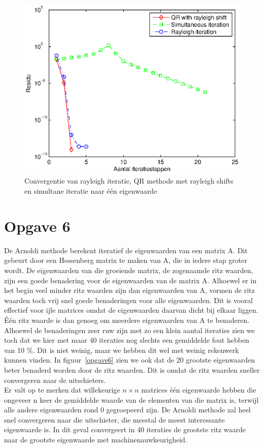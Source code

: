 \documentclass[]{article}
\newcommand{\opgave}[1]{\pagebreak\section*{Opgave #1}}
\begin{document}
\begin{figure}[h]
\noindent \includegraphics[width=1\linewidth]{opgave5.eps}
\caption{Convergentie van rayleigh iteratie, QR methode met rayleigh shifts en simultane iteratie naar \'{e}\'{e}n eigenwaarde}
\label{opgave5}
\end{figure}


\opgave{6}

De Arnoldi methode berekent iteratief de eigenwaarden van een matrix A. Dit gebeurt door een Hessenberg matrix te maken van A, die in iedere stap groter wordt. De eigenwaarden van die groeiende matrix, de zogenaamde ritz waarden, zijn een goede benadering voor de eigenwaarden van de matrix A. Alhoewel er in het begin veel minder ritz waarden zijn dan eigenwaarden van A, vormen de ritz waarden toch vrij snel goede benaderingen voor alle eigenwaarden. Dit is vooral effectief voor ijle matrices omdat de eigenwaarden daarvan dicht bij elkaar liggen. \'{E}\'{e}n ritz waarde is dan genoeg om meerdere eigenwaarden van A te benaderen. \\
Alhoewel de benaderingen zeer ruw zijn met zo een klein aantal iteraties zien we toch dat we hier met maar 40 iteraties nog slechts een gemiddelde fout hebben van 10 $\%$. Dit is niet weinig, maar we hebben dit wel met weinig rekenwerk kunnen vinden. In figuur~\ref{opgave6} zien we ook dat de 20 grootste eigenwaarden beter benaderd worden door de ritz waarden. Dit is omdat de ritz waarden sneller convergeren naar de uitschieters. \\
Er valt op te merken dat willekeurige $n\times n$ matrices \'{e}\'{e}n eigenwaarde hebben die ongeveer n keer de gemiddelde waarde van de elementen van die matrix is, terwijl alle andere eigenwaarden rond 0 gegroepeerd zijn. De Arnoldi methode zal heel snel convergeren naar die uitschieter, die meestal de meest interessante eigenwaarde is. In dit geval convergeert in 40 iteraties de grootste ritz waarde naar de grootste eigenwaarde met machinenauwkeurigheid.
\end{document}
